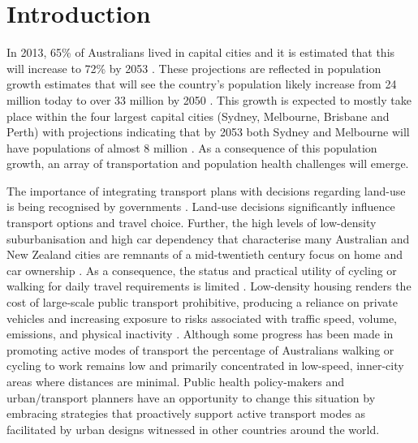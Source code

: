 \documentclass[sageh,times]{sagej}
\begin{document}

\maketitle


\section{Introduction}\label{sec:introduction}



 
In 2013, 65\% of Australians lived in capital cities and it is estimated that this will increase to 72\% by 2053  \citep{ABS2008}. These projections are reflected in population growth estimates that will see the country's population likely increase from 24 million today to over 33 million by 2050  \citep{ABS2008}. This growth is expected to mostly take place within the four largest capital cities (Sydney, Melbourne, Brisbane and Perth) with projections indicating that by 2053 both Sydney and Melbourne will have populations of almost 8 million  \citep{CommonwealthofAustralia2010}. As a consequence of this population growth, an array of transportation and population health challenges will emerge.

The importance of integrating transport plans with decisions regarding land-use is being recognised by governments \citep{ATAP2016,SA2015}. Land-use decisions significantly influence transport options and travel choice. Further, the high levels of low-density suburbanisation and high car dependency that characterise many Australian and New Zealand cities are remnants of a mid-twentieth century focus on home and car ownership \citep{Currie2007,Dodson2008}. As a consequence, the status and practical utility of cycling or walking for daily travel requirements is limited \citep{Heesch2014,Daley2011}. Low-density housing renders the cost of large-scale public transport prohibitive, producing a reliance on private vehicles and increasing exposure to risks associated with traffic speed, volume, emissions, and physical inactivity  \citep{Cepeda2016,MingWen2008,Norman2006}. Although some progress has been made in promoting active modes of transport the percentage of Australians walking or cycling to work remains low and primarily concentrated in low-speed, inner-city areas where distances are minimal. Public health policy-makers and urban/transport planners have an opportunity to change this situation by embracing strategies that proactively support active transport modes as facilitated by urban designs witnessed in other countries around the world.
\end{document}
